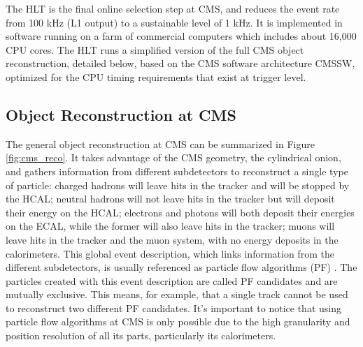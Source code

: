 The HLT is the final online selection step at CMS, and reduces the event rate from 100 kHz (L1 output) to a sustainable level of 1 kHz. 
It is implemented in software running on a farm of commercial computers which includes about 16,000 CPU cores. 
The HLT runs a simplified version of the full CMS object reconstruction, detailed below, based on the CMS software architecture CMSSW, optimized for the CPU timing requirements that exist at trigger level. 


\subsection{Object Reconstruction at CMS}

The general object reconstruction at CMS can be summarized in Figure \ref{fig:cms_reco}. 
It takes advantage of the CMS geometry, the cylindrical onion, and gathers information from different subdetectors to reconstruct a single type of particle: charged hadrons will leave hits in the tracker and will be stopped by the HCAL; neutral hadrons will not leave hits in the tracker but will deposit their energy on the HCAL; electrons and photons will both deposit their energies on the ECAL, while the former will also leave hits in the tracker; muons will leave hits in the tracker and the muon system, with no energy deposits in the calorimeters. 
This global event description, which links information from the different subdetectors, is usually referenced as particle flow algorithms (PF) \cite{cms_pf}. 
The particles created with this event description are called PF candidates and are mutually exclusive. 
This means, for example, that a single track cannot be used to reconstruct two different PF candidates.
It's important to notice that using particle flow algorithms at CMS is only possible due to the high granularity and position resolution of all its parts, particularly its calorimeters. 

